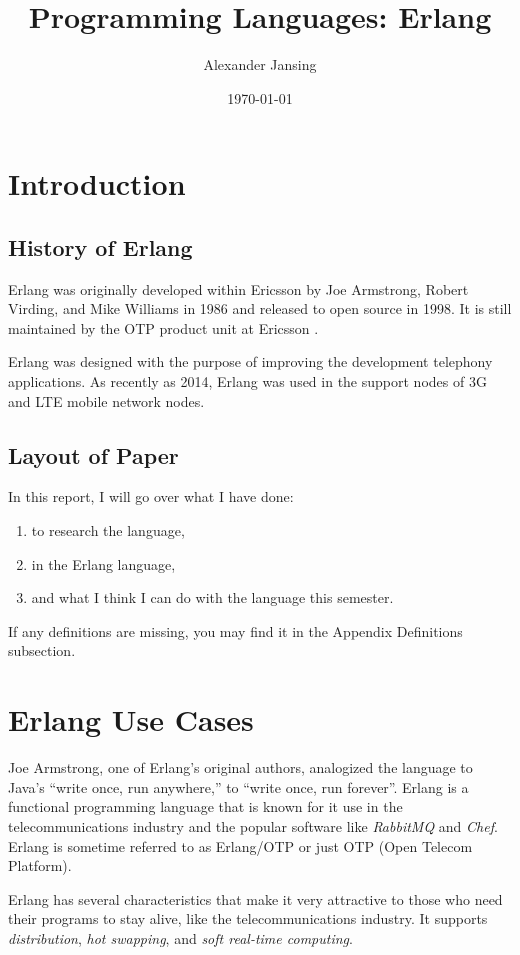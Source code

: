 \documentclass[11 pt]{IEEEtran}
\title{Programming Languages: Erlang}
\author{Alexander Jansing}
\date{\today}
\begin{document}
\maketitle


\section{Introduction}
\subsection{History of Erlang}
Erlang was originally developed within Ericsson by Joe Armstrong, Robert Virding, and Mike Williams in 1986 and released to open source in 1998. It is still maintained by the OTP product unit at Ericsson \cite{wiki}. 

Erlang was designed with the purpose of improving the development telephony applications. As recently as 2014, Erlang was used in the support nodes of 3G and LTE mobile network nodes\cite{wiki}\cite{inside-erlang}.

\subsection{Layout of Paper}
In this report, I will go over what I have done:
\begin{enumerate}
\item to research the language,
\item in the Erlang language,
\item and what I think I can do with the language this semester.
\end{enumerate}

If any definitions are missing, you may find it in the Appendix Definitions subsection.

\section{Erlang Use Cases}
Joe Armstrong, one of Erlang's original authors, analogized the language to Java's ``write once, run anywhere,'' to ``write once, run forever''\cite{run-forever}. Erlang is a functional programming language that is known for it use in the telecommunications industry and the popular software like \emph{RabbitMQ}\cite{ribbitmq-wiki} and \emph{Chef}\cite{chef-wiki}. Erlang is sometime referred to as Erlang/OTP or just OTP (Open Telecom Platform).

Erlang has several characteristics that make it very attractive to those who need their programs to stay alive, like the telecommunications industry. It supports \emph{distribution}, \emph{hot swapping}, and \emph{soft real-time computing}.
\end{document}
